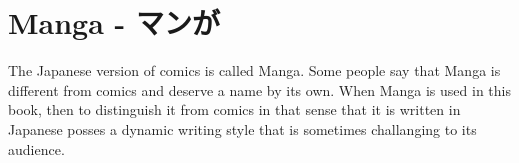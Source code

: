 \section{Manga - マンが} \label{sec:Manga}

The Japanese version of comics is called Manga. Some people say that Manga is
different from comics and deserve a name by its own. When Manga is used in this
book, then to distinguish it from comics in that sense that it is written in
Japanese posses a dynamic writing style that is sometimes challanging to its
audience.


